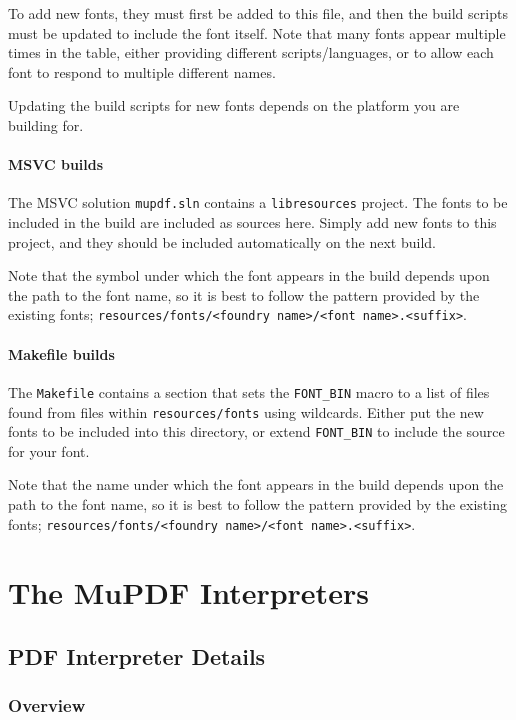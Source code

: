 \documentclass[oneside]{book}
\begin{document}
To add new fonts, they must first be added to this file, and then the build scripts must be updated to include the font itself. Note that many fonts appear multiple times in the table, either providing different scripts/languages, or to allow each font to respond to multiple different names.

Updating the build scripts for new fonts depends on the platform you are building for.

\subsection{MSVC builds}

The MSVC solution \texttt{mupdf.sln} contains a \texttt{libresources} project. The fonts to be included in the build are included as sources here. Simply add new fonts to this project, and they should be included automatically on the next build.

Note that the symbol under which the font appears in the build depends upon the path to the font name, so it is best to follow the pattern provided by the existing fonts; \texttt{resources/fonts/<foundry name>/<font name>.<suffix>}.

\subsection{Makefile builds}

The \texttt{Makefile} contains a section that sets the \texttt{FONT\_BIN} macro to a list of files found from files within \texttt{resources/fonts} using wildcards. Either put the new fonts to be included into this directory, or extend \texttt{FONT\_BIN} to include the source for your font.

Note that the name under which the font appears  in the build depends upon the path to the font name, so it is best to follow the pattern provided by the existing fonts;
\texttt{resources/fonts/<foundry name>/<font name>.<suffix>}.

\part{The MuPDF Interpreters}
\chapter{PDF Interpreter Details}
\label{PDFInterpreter}

\section{Overview}
\end{document}
